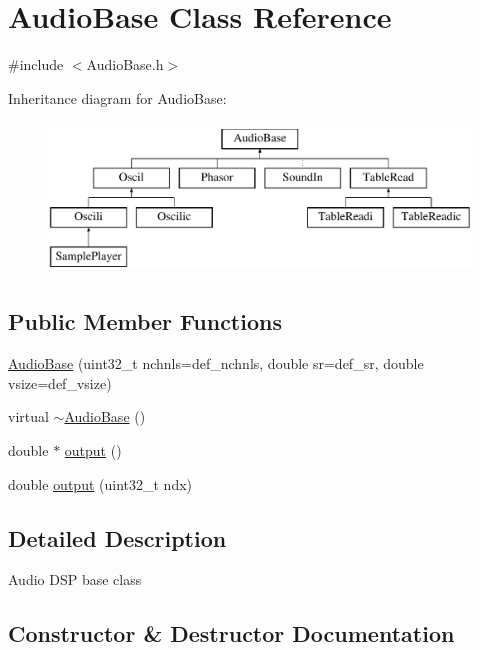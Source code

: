 \hypertarget{class_audio_base}{}\section{Audio\+Base Class Reference}
\label{class_audio_base}


{\ttfamily \#include $<$Audio\+Base.\+h$>$}

Inheritance diagram for Audio\+Base\+:\begin{figure}[H]
\begin{center}
\leavevmode
\includegraphics[height=4.000000cm]{class_audio_base}
\end{center}
\end{figure}
\subsection*{Public Member Functions}
\begin{DoxyCompactItemize}
\item 
\hyperlink{class_audio_base_adc5c0107a42e484ac18ca6f3be49785c}{Audio\+Base} (uint32\+\_\+t nchnls=def\+\_\+nchnls, double sr=def\+\_\+sr, double vsize=def\+\_\+vsize)
\item 
virtual \hyperlink{class_audio_base_a6517030ff62530ae78c7fa63a9512c6d}{$\sim$\+Audio\+Base} ()
\item 
double $\ast$ \hyperlink{class_audio_base_adcdfe60eebbc745101dd0437874ec237}{output} ()
\item 
double \hyperlink{class_audio_base_a51df052f8e916fff79df78558c0193b4}{output} (uint32\+\_\+t ndx)
\end{DoxyCompactItemize}


\subsection{Detailed Description}
Audio D\+SP base class 

\subsection{Constructor \& Destructor Documentation}
\mbox{\label{class_audio_base_adc5c0107a42e484ac18ca6f3be49785c}} 
